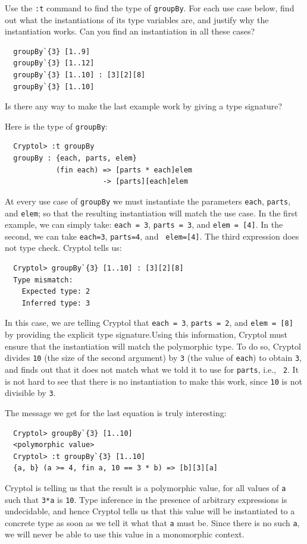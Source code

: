 \begin{Exercise}\label{ex:poly:groupBy}\indGroup
  Use the {\tt :t} command to find the type of {\tt groupBy}. For each
  use case below, find out what the instantiations of its type
  variables are, and justify why the instantiation works. Can you find
  an instantiation in all these cases?
\begin{Verbatim}
  groupBy`{3} [1..9]
  groupBy`{3} [1..12]
  groupBy`{3} [1..10] : [3][2][8]
  groupBy`{3} [1..10]
\end{Verbatim}
Is there any way to make the last example work by giving a type signature?
\end{Exercise}
\begin{Answer}\indGroup
Here is the type of {\tt groupBy}:
\begin{Verbatim}
  Cryptol> :t groupBy
  groupBy : {each, parts, elem} 
            (fin each) => [parts * each]elem 
                       -> [parts][each]elem
\end{Verbatim}
At every use case of {\tt groupBy} we must instantiate the parameters
{\tt each}, {\tt parts}, and {\tt elem}; so that the resulting
instantiation will match the use case.  In the first example, we can
simply take: {\tt each = 3}, {\tt parts = 3}, and {\tt elem = [4]}. In
the second, we can take {\tt each=3}, {\tt parts=4}, and {\tt
  elem=[4]}. The third expression does not type check. Cryptol tells
us:
\begin{Verbatim}
  Cryptol> groupBy`{3} [1..10] : [3][2][8]
  Type mismatch:
    Expected type: 2
    Inferred type: 3
\end{Verbatim}
In this case, we are telling Cryptol that {\tt each = 3}, {\tt parts =
  2}, and {\tt elem = [8]} by providing the explicit type
signature.\indSignature Using this information, Cryptol must ensure
that the instantiation will match the polymorphic type. To do so,
Cryptol divides {\tt 10} (the size of the second argument) by {\tt 3}
(the value of {\tt each}) to obtain {\tt 3}, and finds out that it
does not match what we told it to use for {\tt parts}, i.e., {\tt
  2}. It is not hard to see that there is no instantiation to make this
work, since {\tt 10} is not divisible by {\tt 3}.

The message we get for the last equation is truly interesting:\indFin
\begin{Verbatim}
  Cryptol> groupBy`{3} [1..10]
  <polymorphic value>
  Cryptol> :t groupBy`{3} [1..10]
  {a, b} (a >= 4, fin a, 10 == 3 * b) => [b][3][a]
\end{Verbatim}
Cryptol is telling us that the result is a polymorphic value, for all
values of {\tt a} such that {\tt 3*a} is {\tt 10}.  Type inference in
the presence of arbitrary expressions is undecidable,\indUndecidable
and hence Cryptol tells us that this value will be instantiated to a
concrete type as soon as we tell it what that {\tt a} must be. Since
there is no such {\tt a}, we will never be able to use this value in a
monomorphic context.
\end{Answer}

